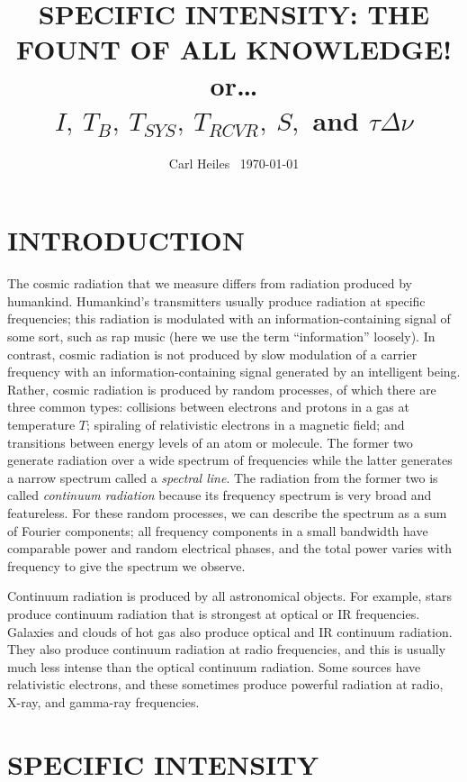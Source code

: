 \documentclass[12pt,psfig,preprint]{aastex}
\begin{document}
 
\title{SPECIFIC INTENSITY: THE FOUNT OF ALL KNOWLEDGE! \\ or\dots \\
{\boldmath $I, \ T_B, \ T_{SYS}, \ T_{RCVR}, \ S,$ and $\tau
\Delta \nu$}}


\author{ Carl Heiles \ \today} 

\tableofcontents

\section {INTRODUCTION}

	The cosmic radiation that we measure differs from radiation
produced by humankind.   Humankind's transmitters usually produce
radiation at specific frequencies; this radiation is modulated with an
information-containing signal of some sort, such as rap music (here we
use the term ``information'' loosely).  In contrast, cosmic radiation is
not produced by slow modulation of a carrier frequency with an
information-containing signal generated by an intelligent being. 
Rather, cosmic radiation is produced by random processes, of which there
are three common types: collisions between electrons and protons in a
gas at temperature $T$; spiraling of relativistic electrons in a
magnetic field; and transitions between energy levels of an atom or
molecule.  The former two generate radiation over a wide spectrum of
frequencies while the latter generates a narrow spectrum called a {\it
spectral line}.  The radiation from the former two is called {\it
continuum radiation} because its frequency spectrum is very broad and
featureless.  For these random processes, we can describe the spectrum
as a sum of Fourier components; all frequency components in a small
bandwidth have comparable power and random electrical phases, and the
total power varies with frequency to give the spectrum we observe.

	Continuum radiation is produced by all astronomical objects. 
For example, stars produce continuum radiation that is strongest at
optical or IR frequencies.  Galaxies and clouds of hot gas also produce
optical and IR continuum radiation.  They also produce continuum
radiation at radio frequencies, and this is usually much less intense
than the optical continuum radiation. Some sources have relativistic
electrons, and these sometimes produce powerful radiation at radio,
X-ray, and gamma-ray frequencies.

\section{SPECIFIC INTENSITY}
\end{document}
